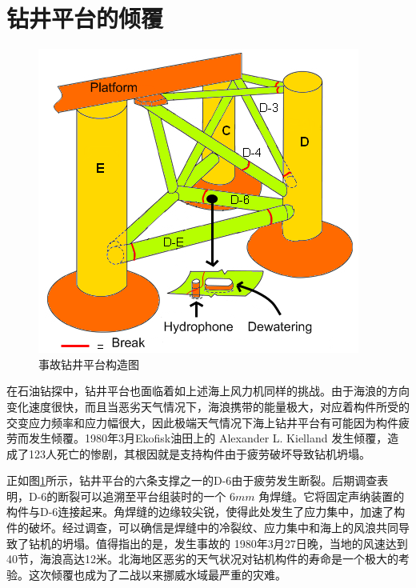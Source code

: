 \documentclass[12pt, a4paper]{ctexart}
\begin{document}
\section{钻井平台的倾覆}

\begin{figure}[ht]	
	\centering
	\includegraphics[scale=0.6]{33.png}
	\caption{事故钻井平台构造图}
	\label{fig:label3}
\end{figure}

在石油钻探中，钻井平台也面临着如上述海上风力机同样的挑战。由于海浪的方向变化速度很快，而且当恶劣天气情况下，海浪携带的能量极大，对应着构件所受的交变应力频率和应力幅很大，因此极端天气情况下海上钻井平台有可能因为构件疲劳而发生倾覆。1980年3月Ekofisk油田上的 Alexander L. Kielland 发生倾覆，造成了123人死亡的惨剧，其根因就是支持构件由于疲劳破坏导致钻机坍塌。


正如图\ref{fig:label3}所示，钻井平台的六条支撑之一的D-6由于疲劳发生断裂。后期调查表明，D-6的断裂可以追溯至平台组装时的一个 $ 6mm $ 角焊缝。它将固定声纳装置的构件与D-6连接起来。角焊缝的边缘较尖锐，使得此处发生了应力集中，加速了构件的破坏。经过调查，可以确信是焊缝中的冷裂纹、应力集中和海上的风浪共同导致了钻机的坍塌。值得指出的是，发生事故的 1980年3月27日晚，当地的风速达到40节，海浪高达12米。北海地区恶劣的天气状况对钻机构件的寿命是一个极大的考验。这次倾覆也成为了二战以来挪威水域最严重的灾难。

\end{document}
